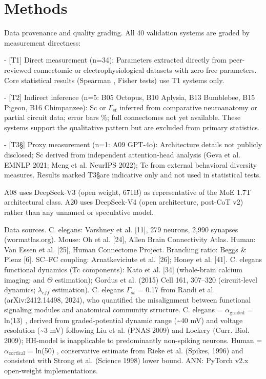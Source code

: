 \documentclass[a4paper,12pt]{article}
\begin{document}
\section{Methods}

Data provenance and quality grading. All 40 validation systems are graded by measurement directness:

- [T1] Direct measurement (n=34): Parameters extracted directly from peer-reviewed connectomic or electrophysiological datasets with zero free parameters. Core statistical results (Spearman  \rho , Fisher tests) use T1 systems only.

- [T2\dag] Indirect inference (n=5: B05 Octopus, B10 Aplysia, B13 Bumblebee, B15 Pigeon, B16 Chimpanzee): Sc or $\Gamma_{st}$ inferred from comparative neuroanatomy or partial circuit data; error bars  \%; full connectomes not yet available. These systems support the qualitative pattern but are excluded from primary statistics.

- [T3\S] Proxy measurement (n=1: A09 GPT-4o): Architecture details not publicly disclosed; Sc derived from independent attention-head analysis (Geva et al. EMNLP 2021; Meng et al. NeurIPS 2022); Tc from external behavioral diversity measures. Results marked T3\S are indicative only and not used in statistical tests.

A08 uses DeepSeek-V3 (open weight, 671B) as representative of the MoE 1.7T architectural class. A20 uses DeepSeek-V4 (open architecture, post-CoT v2) rather than any unnamed or speculative model.

Data sources.
C. elegans: Varshney et al. [11], 279 neurons, 2,990 synapses (wormatlas.org).
Mouse: Oh et al. [24], Allen Brain Connectivity Atlas.
Human: Van Essen et al. [25], Human Connectome Project.
Branching ratio: Beggs \& Plenz [6].
SC--FC coupling: Arnatkeviciute et al. [26]; Honey et al. [41].
C. elegans functional dynamics (Tc components): Kato et al. [34] (whole-brain calcium imaging;  \Psi  and $\Theta$ estimation); Gordus et al. (2015) Cell 161, 307--320 (circuit-level dynamics; $\lambda_{eff}$ estimation).
C. elegans $\Gamma_{st}$ = 0.17 from Randi et al. (arXiv:2412.14498, 2024), who quantified the misalignment between functional signaling modules and anatomical community structure.
C. elegans  \alpha  = $\alpha_{\text{graded}}$ = ln(13)  , derived from graded-potential dynamic range (\textasciitilde{}40 mV) and voltage resolution (\textasciitilde{}3 mV) following Liu et al. (PNAS 2009) and Lockery (Curr.
Biol. 2009); HH-model  \alpha  is inapplicable to predominantly non-spiking neurons.
Human  \alpha  = $\alpha_{\text{cortical}}$ = ln(50)  , conservative estimate from Rieke et al. (Spikes, 1996) and consistent with Strong et al. (Science 1998) lower bound.
ANN: PyTorch v2.x open-weight implementations.
\end{document}
